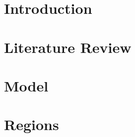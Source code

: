 \documentclass[
	12pt, 
	]{article}
\begin{document}


{
	\setlength{\parskip}{1pt}
	\singlespacing
	\tableofcontents
}

\thispagestyle{empty}

\newpage


\section{Introduction}\label{sec:introduction}





\section{Literature Review}\label{sec:literature-review}



\newpage


\section{Model}\label{sec:model}



\newpage


\section{Regions}


\end{document}
